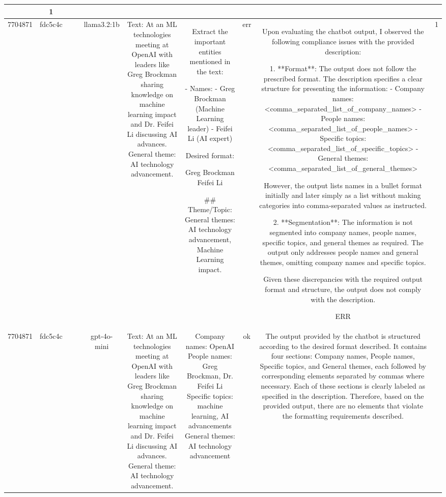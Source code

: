 \begin{table}[h!]
\begin{tabular}{|c|c|c|c|c|c|c|c|c|c|}
{OK & 1\\
\hline
7704871 & fdc5c4c &  &  & llama3.2:1b & Text: At an ML technologies meeting at OpenAI with leaders like Greg Brockman sharing knowledge on machine learning impact and Dr. Feifei Li discussing AI advances. General theme: AI technology advancement. & Extract the important entities mentioned in the text:

- Names:
  - Greg Brockman (Machine Learning leader)
  - Feifei Li (AI expert)

Desired format:

Greg Brockman
Feifei Li

## Theme/Topic: 
General themes: AI technology advancement, Machine Learning impact. & err & Upon evaluating the chatbot output, I observed the following compliance issues with the provided description:

1. **Format**: The output does not follow the prescribed format. The description specifies a clear structure for presenting the information:
   - Company names: <comma_separated_list_of_company_names>
   - People names: <comma_separated_list_of_people_names>
   - Specific topics: <comma_separated_list_of_specific_topics>
   - General themes: <comma_separated_list_of_general_themes>

However, the output lists names in a bullet format initially and later simply as a list without making categories into comma-separated values as instructed. 

2. **Segmentation**: The information is not segmented into company names, people names, specific topics, and general themes as required. The output only addresses people names and general themes, omitting company names and specific topics.

Given these discrepancies with the required output format and structure, the output does not comply with the description.

ERR & 1\\
\hline
7704871 & fdc5c4c &  &  & gpt-4o-mini & Text: At an ML technologies meeting at OpenAI with leaders like Greg Brockman sharing knowledge on machine learning impact and Dr. Feifei Li discussing AI advances. General theme: AI technology advancement. & Company names: OpenAI  
People names: Greg Brockman, Dr. Feifei Li  
Specific topics: machine learning, AI advancements  
General themes: AI technology advancement   & ok & The output provided by the chatbot is structured according to the desired format described. It contains four sections: Company names, People names, Specific topics, and General themes, each followed by corresponding elements separated by commas where necessary. Each of these sections is clearly labeled as specified in the description. Therefore, based on the provided output, there are no elements that violate the formatting requirements described.

}
\end{tabular}
\end{table}
